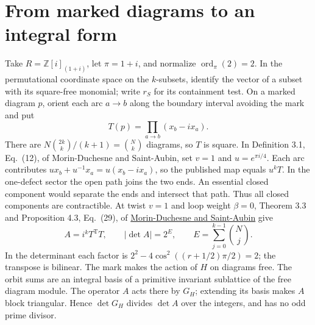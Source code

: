\documentclass[11pt]{article}
\newcommand{\ord}{\operatorname{ord}_{\pi}}
\begin{document}
\section{From marked diagrams to an integral form}
Take \(R=\mathbb Z[i]_{(1+i)}\), let \(\pi=1+i\), and normalize
\(\ord(2)=2\). In the permutational coordinate space on the \(k\)-subsets,
identify the vector of a subset with its square-free monomial; write
\(r_S\) for its containment test. On a marked diagram \(p\), orient
each arc \(a\to b\) along the boundary interval avoiding the mark and put
\[
 T(p)=\prod_{a\to b}(x_b-i x_a).
\]
There are \(N\binom{2k}k/(k+1)=\binom Nk\) diagrams, so \(T\) is square.
In Definition 3.1, Eq.~(12), of Morin-Duchesne and Saint-Aubin, set
\(v=1\) and \(u=e^{\pi i/4}\). Each arc contributes
\(u x_b+u^{-1}x_a=u(x_b-i x_a)\), so the published map equals \(u^kT\).
In the one-defect sector the open path joins the two ends. An essential
closed component would separate the ends and intersect that path.
Thus all closed components are
contractible. At twist \(v=1\) and loop weight \(\beta=0\),
Theorem 3.3 and Proposition 4.3, Eq.~(29), of
\href{https://arxiv.org/abs/1203.4996}{Morin-Duchesne and Saint-Aubin}
give
\[
 A=i^k T^{\mathrm T}T,\qquad |\det A|=2^E,\qquad
 E=\sum_{j=0}^{k-1}\binom Nj .
\]
In the determinant each factor is
\(2^2-4\cos^2((r+1/2)\pi/2)=2\); the transpose is bilinear.
The mark makes the action of \(H\) on diagrams free. The orbit sums
are an integral basis of a primitive invariant sublattice
of the free diagram module. The operator \(A\) acts there by \(G_H\);
extending its basis makes \(A\) block triangular. Hence \(\det G_H\)
divides \(\det A\) over the integers, and has no odd prime divisor.
\end{document}
